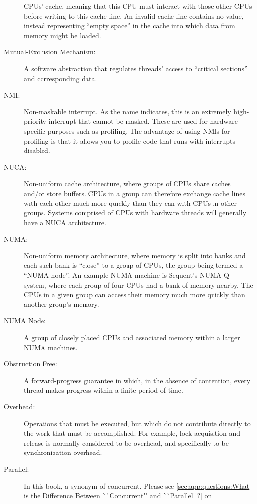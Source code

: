 \begin{description}
	CPUs' cache, meaning that this CPU must interact with those other
	CPUs before writing to this cache line.
	An invalid cache line contains no value, instead representing
	``empty space'' in the cache into which data from memory might
	be loaded.
\item[Mutual-Exclusion Mechanism:]
	A software abstraction that regulates threads' access to
	``critical sections'' and corresponding data.
\item[NMI:]
	Non-maskable interrupt.
	As the name indicates, this is an extremely high-priority
	interrupt that cannot be masked.
	These are used for hardware-specific purposes such as profiling.
	The advantage of using NMIs for profiling is that it allows you
	to profile code that runs with interrupts disabled.
\item[NUCA:]
	Non-uniform cache architecture, where groups of CPUs share
	caches and/or store buffers.
	CPUs in a group can therefore exchange cache lines with each
	other much more quickly than they can with CPUs in other groups.
	Systems comprised of CPUs with hardware threads will generally
	have a NUCA architecture.
\item[NUMA:]
	Non-uniform memory architecture, where memory is split into
	banks and each such bank is ``close'' to a group of CPUs,
	the group being termed a ``NUMA node''.
	An example NUMA machine is Sequent's NUMA-Q system, where
	each group of four CPUs had a bank of memory nearby.
	The CPUs in a given group can access their memory much
	more quickly than another group's memory.
\item[NUMA Node:]
	A group of closely placed CPUs and associated memory within
	a larger NUMA machines.
\item[Obstruction Free:]
	A forward-progress guarantee in which, in the absence of
	contention, every thread makes progress within a finite
	period of time.
\item[Overhead:]
	Operations that must be executed, but which do not contribute
	directly to the work that must be accomplished.
	For example, lock acquisition and release is normally considered
	to be overhead, and specifically to be synchronization overhead.
\item[Parallel:]
	In this book, a synonym of concurrent.
	Please see \cref{sec:app:questions:What is the Difference Between ``Concurrent'' and ``Parallel''?}
	on 

\end{description}
